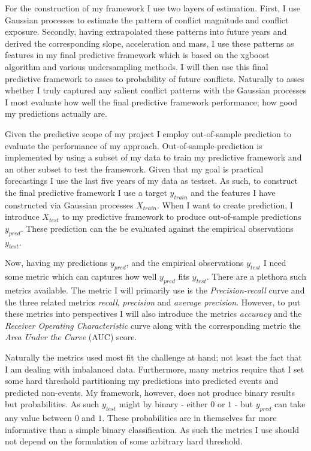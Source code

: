 \documentclass[a4paper]{article}
\begin{document}
For the construction of my framework I use two layers of estimation. First, I use Gaussian processes to estimate the pattern of conflict magnitude and conflict exposure. Secondly, having extrapolated these patterns into future years and derived the corresponding slope, acceleration and mass, I use these patterns as features in my final predictive framework which is based on the xgboost algorithm and various undersampling methods. I will then use this final predictive framework to asses to probability of future conflicts. Naturally to asses whether I truly captured any salient conflict patterns with the Gaussian processes I most evaluate how well the final predictive framework performance; how good my predictions actually are.\par

Given the predictive scope of my project I employ out-of-sample prediction to evaluate the performance of my approach. Out-of-sample-prediction is implemented by using a subset of my data to train my predictive framework and an other subset to test the framework. Given that my goal is practical forecastings I use the last five years of my data as testset. As such, to construct the final predictive framework I use a target $y_{train}$ and the features I have constructed via Gaussian processes $X_{train}$. When I want to create prediction, I introduce $X_{test}$ to my predictive framework to produce out-of-sample predictions $y_{pred}$. These prediction can the be evaluated against the empirical observations $y_{test}$.\par

Now, having my predictions $y_{pred}$, and the empirical observations $y_{test}$ I need some metric which can captures how well $y_{pred}$ fits $y_{test}$. There are a plethora such metrics available. The metric I will primarily use is the \emph{Precision-recall} curve and the three related metrics \emph{recall}, \emph{precision} and \emph{average precision}. However, to put these metrics into perspectives I will also introduce the metrics \emph{accuracy} and the \emph{Receiver Operating Characteristic} curve along with the corresponding metric the \emph{Area Under the Curve} (AUC) score.\par

Naturally the metrics used most fit the challenge at hand; not least the fact that I am dealing with imbalanced data. Furthermore, many metrics require that I set some hard threshold partitioning my predictions into predicted events and predicted non-events. My framework, however, does not produce binary results but probabilities. As such $y_{test}$ might by binary  - either $0$ or $1$ - but $y_{pred}$ can take any value between $0$ and $1$. These probabilities are in themselves far more informative than a simple binary classification. As such the metrics I use should not depend on the formulation of some arbitrary hard threshold.\par 
\end{document}
